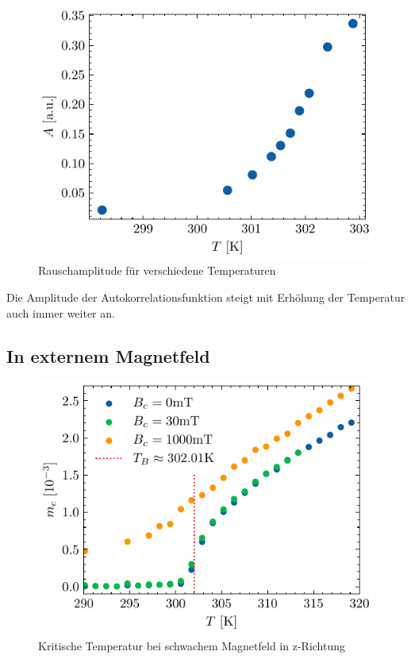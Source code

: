 \documentclass[main.tex]{subfiles}
\begin{document}
\begin{figure}[H]
    \centering
    \includegraphics{bilder/plots/temp_comparison_long/rauschamplitude.pdf}
    \caption{Rauschamplitude für verschiedene Temperaturen}\label{fig:temp-autocorr-amplitude}
\end{figure}

Die Amplitude der Autokorrelationsfunktion steigt mit Erhöhung der Temperatur auch immer weiter an.

\subsection{In externem Magnetfeld}


\begin{figure}[H]
    \centering
    \includegraphics{bilder/plots/Bz_comparison/critical_temperature.pdf}
    \caption{Kritische Temperatur bei schwachem Magnetfeld in z-Richtung}\label{fig:bz-crit-temp}
\end{figure}
\end{document}
